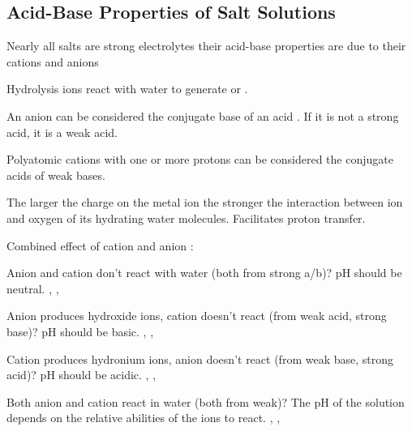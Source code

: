 \begin{mdframed}
\begin{multicols}{2}
\subsection{Acid-Base Properties of Salt Solutions}
\begin{compactdesc}
\item[Nearly all salts are strong electrolytes] their acid-base properties
    are due to their cations and anions
\item[Hydrolysis] ions react with water to generate  or .
\item[An anion can be considered] the conjugate base of an acid .
    If it is not a strong acid, it is a weak acid.
\item[Polyatomic cations with one or more protons] can be considered the
    conjugate acids of weak bases.
\item[The larger the charge on the metal ion] the stronger the interaction
    between ion and oxygen of its hydrating water molecules. Facilitates
    proton transfer.
\item[Combined effect of cation and anion]:
    \begin{compactenum}
    \item Anion and cation don't react with water (both from strong a/b)?
        pH should be neutral. , , 
    \item Anion produces hydroxide ions, cation doesn't react (from weak acid, strong base)?
        pH should be basic. , , 
    \item Cation produces hydronium ions, anion doesn't react (from weak base, strong acid)?
        pH should be acidic. , , 
    \item Both anion and cation react in water (both from weak)?
        The pH of the solution depends on the relative abilities of the ions to
        react.
        , , 
    \end{compactenum}
\end{compactdesc}

\end{multicols}
\end{mdframed}


